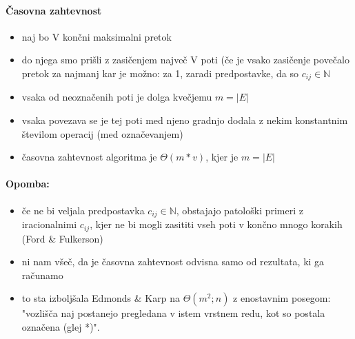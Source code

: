 \documentclass[a4paper,10pt]{article}
\begin{document}
\paragraph{\v Casovna zahtevnost}
\begin{itemize}
\item naj bo V kon\v cni maksimalni pretok
\item do njega smo pri\v sli z zasi\v cenjem najve\v c V poti (\v ce je vsako zasi\v cenje pove\v calo pretok za najmanj kar je mo\v zno: za 1, zaradi predpostavke, da so $c_{ij} \in \mathbb{N}$
\item vsaka od neozna\v cenih poti je dolga kve\v cjemu $m=|E|$
\item vsaka povezava se je tej poti med njeno gradnjo dodala z nekim konstantnim \v stevilom operacij (med ozna\v cevanjem)
\item \v casovna zahtevnost algoritma je $\Theta(m*v)$, kjer je $m=|E|$
\end{itemize}

\paragraph{Opomba:}
\begin{itemize}
\item \v ce ne bi veljala predpostavka $c_{ij} \in \mathbb{N}$, obstajajo patolo\v ski primeri z iracionalnimi $c_{ij}$, kjer ne bi mogli zasititi vseh poti v kon\v cno mnogo korakih (Ford \& Fulkerson)
\item ni nam v\v se\v c, da je \v casovna zahtevnost odvisna samo od rezultata, ki ga ra\v cunamo
\item to sta izbolj\v sala Edmonds \& Karp na $\Theta(m^2; n)$ z enostavnim posegom:\\
"vozli\v s\v ca naj postanejo pregledana v istem vrstnem redu, kot so postala ozna\v cena (glej *)".
\end{itemize}
\end{document}

